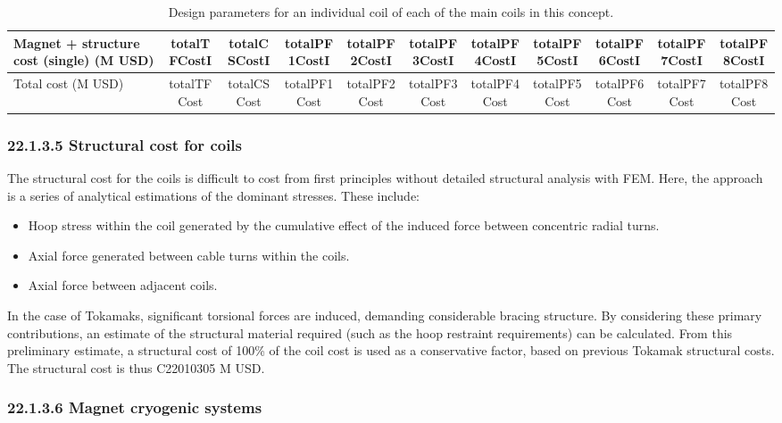 \begin{table}[h]
{\begin{tabular}{lcccccccccc}
Magnet + structure cost (single) (M USD) & totalTFCostI & totalCSCostI & totalPF1CostI & totalPF2CostI & totalPF3CostI & totalPF4CostI & totalPF5CostI & totalPF6CostI & totalPF7CostI & totalPF8CostI \\
\hline
Total cost (M USD) & totalTFCost & totalCSCost & totalPF1Cost & totalPF2Cost & totalPF3Cost & totalPF4Cost & totalPF5Cost & totalPF6Cost & totalPF7Cost & totalPF8Cost \\
\hline
\end{tabular}}
\caption{Design parameters for an individual coil of each of the main coils in this concept.}
\label{your-table-label}
\end{table}


\subsubsection*{22.1.3.5 Structural cost for coils}

The structural cost for the coils is difficult to cost from first principles without detailed structural analysis with FEM. Here, the approach is a series of analytical estimations of the dominant stresses. These include:

\begin{itemize}
    \item Hoop stress within the coil generated by the cumulative effect of the induced force between concentric radial turns.
    \item Axial force generated between cable turns within the coils. 
    \item Axial force between adjacent coils.
\end{itemize}


In the case of Tokamaks, significant torsional forces are induced, demanding considerable bracing structure. By considering these primary contributions, an estimate of the structural material required (such as the hoop restraint requirements) can be calculated. From this preliminary estimate, a structural cost of 100\% of the coil cost is used as a conservative factor, based on previous Tokamak structural costs. The structural cost is thus C22010305 M USD.


\subsubsection*{22.1.3.6 Magnet cryogenic systems}

